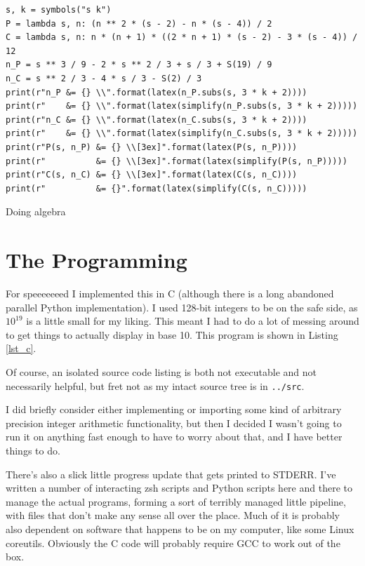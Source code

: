 \begin{longlisting}
\begin{verbatim}
s, k = symbols("s k")
P = lambda s, n: (n ** 2 * (s - 2) - n * (s - 4)) / 2
C = lambda s, n: n * (n + 1) * ((2 * n + 1) * (s - 2) - 3 * (s - 4)) / 12
n_P = s ** 3 / 9 - 2 * s ** 2 / 3 + s / 3 + S(19) / 9
n_C = s ** 2 / 3 - 4 * s / 3 - S(2) / 3
print(r"n_P &= {} \\".format(latex(n_P.subs(s, 3 * k + 2))))
print(r"    &= {} \\".format(latex(simplify(n_P.subs(s, 3 * k + 2)))))
print(r"n_C &= {} \\".format(latex(n_C.subs(s, 3 * k + 2))))
print(r"    &= {} \\".format(latex(simplify(n_C.subs(s, 3 * k + 2)))))
print(r"P(s, n_P) &= {} \\[3ex]".format(latex(P(s, n_P))))
print(r"          &= {} \\[3ex]".format(latex(simplify(P(s, n_P)))))
print(r"C(s, n_C) &= {} \\[3ex]".format(latex(C(s, n_C))))
print(r"          &= {}".format(latex(simplify(C(s, n_C)))))
\end{verbatim}
\caption{Doing algebra}\label{lst_sympy_alg}
\end{longlisting}

\section{The Programming}

For speeeeeeed I implemented this in C (although there is a long abandoned
parallel Python implementation). I used 128-bit integers to be on the safe side,
as \(10^{19}\) is a little small for my liking. This meant I had to do a lot of
messing around to get things to actually display in base 10. This program is
shown in Listing \ref{lst_c}.

Of course, an isolated source code listing is both not executable and not
necessarily helpful, but fret not as my intact source tree is in
\texttt{../src}.

I did briefly consider either implementing or importing some kind of arbitrary
precision integer arithmetic functionality, but then I decided I wasn't going to
run it on anything fast enough to have to worry about that, and I have better
things to do.

There's also a slick little progress update that gets printed to STDERR. I've
written a number of interacting zsh scripts and Python scripts here and there to
manage the actual programs, forming a sort of terribly managed little pipeline,
with files that don't make any sense all over the place. Much of it is probably
also dependent on software that happens to be on my computer, like some Linux
coreutils. Obviously the C code will probably require GCC to work out of the
box.

